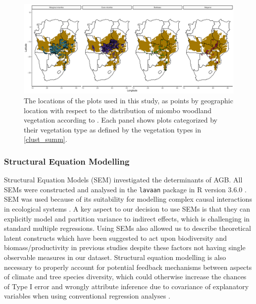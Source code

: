 \documentclass[11pt,a4paper]{article}
\begin{document}
\begin{landscape}


\begin{figure}[H]
\centering
	\includegraphics[width=1.4\textwidth]{clust_map}
	\caption{The locations of the \nplots{} plots used in this study, as points by geographic location with respect to the distribution of miombo woodland vegetation according to \citet{White1987}. Each panel shows plots categorized by their vegetation type as defined by the vegetation types in \autoref{clust_summ}.}
	\label{clust_map}
\end{figure}
\end{landscape}

\subsubsection{Structural Equation Modelling}

Structural Equation Models (SEM) investigated the determinants of AGB. All SEMs were constructed and analysed in the \verb|lavaan| package \citep{lavaan} in R version 3.6.0 \citep{R2019}. SEM was used because of its suitability for modelling complex causal interactions in ecological systems \citep{Lee2007}. A key aspect to our decision to use SEMs is that they can explicitly model and partition variance to indirect effects, which is challenging in standard multiple regressions. Using SEMs also allowed us to describe theoretical latent constructs which have been suggested to act upon biodiversity and biomass/productivity in previous studies despite these factors not having single observable measures in our dataset. Structural equation modelling is also necessary to properly account for potential feedback mechanisms between aspects of climate and tree species diversity, which could otherwise increase the chances of Type I error and wrongly attribute inference due to covariance of explanatory variables when using conventional regression analyses \citep{Nachtigall2003}.
\end{document}
